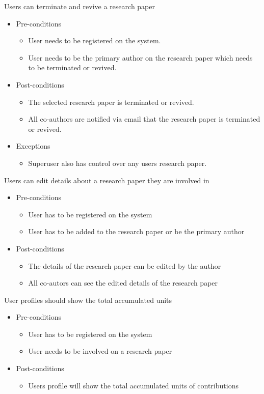 \documentclass[a4paper,12pt]{report}
\begin{document}
	Users can terminate and revive a research paper
	\begin{itemize}
		\item Pre-conditions
			\begin{itemize}
				\item User needs to be registered on the system.
				\item User needs to be the primary author on the research paper which needs to be terminated or revived.
			\end{itemize}
		\item Post-conditions
			\begin{itemize}
				\item The selected research paper is terminated or revived.
				\item All co-authors are notified via email that the research paper is terminated or revived.
			\end{itemize}
		\item Exceptions
			\begin{itemize}
				\item Superuser also has control over any users research paper.
			\end{itemize}
	\end{itemize}

	Users can edit details about a research paper they are involved in
	\begin{itemize}
		\item Pre-conditions
			\begin{itemize}
				\item User has to be registered on the system
				\item User has to be added to the research paper or be the primary author
			\end{itemize}
		\item Post-conditions
			\begin{itemize}
				\item The details of the research paper can be edited by the author
				\item All co-autors can see the edited details of the research paper
			\end{itemize}
	\end{itemize}

	User profiles should show the total accumulated units
	\begin{itemize}
		\item Pre-conditions
			\begin{itemize}
				\item User has to be registered on the system
				\item User needs to be involved on a research paper
			\end{itemize}
		\item Post-conditions
			\begin{itemize}
				\item Users profile will show the total accumulated units of contributions
			\end{itemize}
	\end{itemize}
\end{document}
